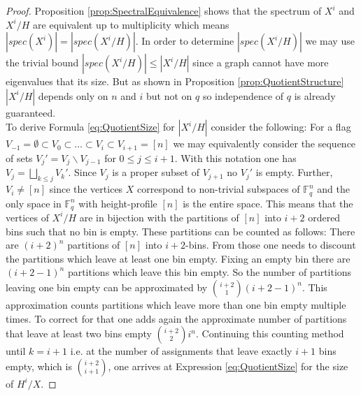 \documentclass[11pt]{amsart}
\begin{document}
    \begin{proof}
        Proposition \ref{prop:SpectralEquivalence} shows that the spectrum of $X^i$ and $X^i/H$ are equivalent up to multiplicity which means $|spec(X^i)|=|spec(X^i/H)|$. In order to determine $|spec(X^i/H)|$ we may use the trivial bound $|spec(X^i/H)|\leq |X^i/H|$ since a graph cannot have more eigenvalues that its size. But as shown in Proposition \ref{prop:QuotientStructure} $|X^i/H|$ depends only on $n$ and $i$ but not on $q$ so independence of $q$ is already guaranteed.\\
        To derive Formula \ref{eq:QuotientSize} for $|X^i/H|$ consider the following: For a flag $V_{-1}=\emptyset\subset V_0\subset\dots\subset V_i\subset V_{i+1}=[n]$ we may equivalently consider the sequence of sets $V_j'=V_{j}\backslash V_{j-1}$  for $0\leq j\leq i+1$. With this notation one has $V_j=\bigsqcup_{k\leq j} V_k'$. Since $V_j$ is a proper subset of $V_{j+1}$ no $V_j'$ is empty. Further, $V_i\neq [n]$ since the vertices $X$ correspond to non-trivial subspaces of $\mathbb{F}_q^n$ and the only space in $\mathbb{F}_q^n$ with height-profile  $[n]$ is the entire space.  This means that the vertices of $X^i/H$ are in bijection with the partitions of $[n]$ into $i+2$ ordered bins such that no bin is empty. These partitions can be counted as follows: There are $(i+2)^n$ partitions of $[n]$ into $i+2$-bins. From those one needs to discount the partitions which leave at least one bin empty. Fixing an empty bin there are $(i+2-1)^n$ partitions which leave this bin empty. So the number of partitions leaving one bin empty can be approximated by $\binom{i+2}{1}(i+2-1)^n$. This approximation counts partitions which leave more than one bin empty multiple times. To correct for that one adds again the approximate number of partitions that leave at least two bins empty $\binom{i+2}{2}i^n$. Continuing this counting method until $k=i+1$ i.e. at the number of assignments that leave exactly $i+1$ bins empty, which is $\binom{i+2}{i+1}$, one arrives at Expression \ref{eq:QuotientSize} for the size of $H^i/X$.
    \end{proof}
\end{document}
